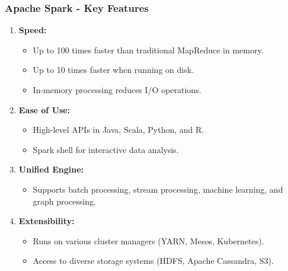 \documentclass[aspectratio=169]{beamer}
\begin{document}
\begin{frame}[fragile]
    \frametitle{Apache Spark - Key Features}
    \begin{enumerate}
        \item \textbf{Speed:}
        \begin{itemize}
            \item Up to 100 times faster than traditional MapReduce in memory.
            \item Up to 10 times faster when running on disk.
            \item In-memory processing reduces I/O operations.
        \end{itemize}
        
        \item \textbf{Ease of Use:}
        \begin{itemize}
            \item High-level APIs in Java, Scala, Python, and R.
            \item Spark shell for interactive data analysis.
        \end{itemize}
        
        \item \textbf{Unified Engine:}
        \begin{itemize}
            \item Supports batch processing, stream processing, machine learning, and graph processing.
        \end{itemize}
        
        \item \textbf{Extensibility:}
        \begin{itemize}
            \item Runs on various cluster managers (YARN, Mesos, Kubernetes).
            \item Access to diverse storage systems (HDFS, Apache Cassandra, S3).
        \end{itemize}
    \end{enumerate}
\end{frame}
\end{document}

